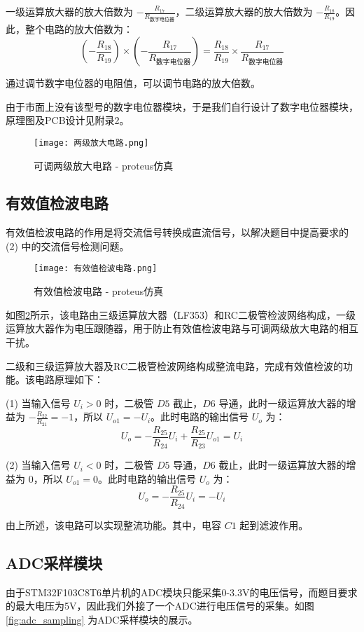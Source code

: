 \documentclass[lang=cn,11pt,a4paper]{elegantpaper}
\begin{document}
一级运算放大器的放大倍数为 \( -\frac{R_{17}}{R_{\text{数字电位器}}} \)，二级运算放大器的放大倍数为 \( -\frac{R_{18}}{R_{19}} \)。因此，整个电路的放大倍数为：
\[
  \left( -\frac{R_{18}}{R_{19}} \right) \times \left( -\frac{R_{17}}{R_{\text{数字电位器}}} \right) = \frac{R_{18}}{R_{19}} \times \frac{R_{17}}{R_{\text{数字电位器}}}
\]

通过调节数字电位器的电阻值，可以调节电路的放大倍数。

由于市面上没有该型号的数字电位器模块，于是我们自行设计了数字电位器模块，原理图及PCB设计见附录2。
\begin{figure}[!htb]
  \centering
  \texttt{[image: 两级放大电路.png]}
  \caption{可调两级放大电路 - proteus仿真}
  \label{fig:two_stage_amplifier}
\end{figure}

\subsection{有效值检波电路}
有效值检波电路的作用是将交流信号转换成直流信号，以解决题目中提高要求的 (2) 中的交流信号检测问题。

\begin{figure}[!htb]
  \centering
  \texttt{[image: 有效值检波电路.png]}
  \caption{有效值检波电路 - proteus仿真}
  \label{fig:effective_value_detection}
\end{figure}

如图\ref{fig:effective_value_detection}所示，该电路由三级运算放大器（LF353）和RC二极管检波网络构成，一级运算放大器作为电压跟随器，用于防止有效值检波电路与可调两级放大电路的相互干扰。

二级和三级运算放大器及RC二极管检波网络构成整流电路，完成有效值检波的功能。该电路原理如下：

(1) 当输入信号 \( U_i > 0 \) 时，二极管 \( D5 \) 截止，\( D6 \) 导通，此时一级运算放大器的增益为 \( -\frac{R_22}{R_21} = -1 \)，所以 \( U_{o1} = -U_i \)。此时电路的输出信号 \( U_o \) 为：
\[
  U_o = -\frac{R_25}{R_24} U_i + \frac{R_25}{R_23} U_{o1} = U_i
\]

(2) 当输入信号 \( U_i < 0 \) 时，二极管 \( D5 \) 导通，\( D6 \) 截止，此时一级运算放大器的增益为 0，所以 \( U_{o1} = 0 \)。此时电路的输出信号 \( U_o \) 为：
\[
  U_o = -\frac{R_25}{R_24} U_i = -U_i
\]

由上所述，该电路可以实现整流功能。其中，电容 \( C1 \) 起到滤波作用。

\subsection{ADC采样模块}
由于STM32F103C8T6单片机的ADC模块只能采集0-3.3V的电压信号，而题目要求的最大电压为5V，因此我们外接了一个ADC进行电压信号的采集。如图\ref{fig:adc_sampling} 为ADC采样模块的展示。
\end{document}
